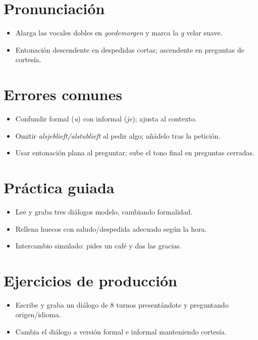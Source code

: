 \section{Pronunciación}
\begin{itemize}[leftmargin=*]
	\item Alarga las vocales dobles en \textit{goedemorgen} y marca la \textit{g} velar suave.
	\item Entonación descendente en despedidas cortas; ascendente en preguntas de cortesía.
\end{itemize}

\section{Errores comunes}
\begin{itemize}[leftmargin=*]
	\item Confundir formal (\textit{u}) con informal (\textit{je}); ajusta al contexto.
	\item Omitir \textit{alsjeblieft/alstublieft} al pedir algo; añádelo tras la petición.
	\item Usar entonación plana al preguntar; sube el tono final en preguntas cerradas.
\end{itemize}

\section{Práctica guiada}
\begin{itemize}[leftmargin=*]
	\item Lee y graba tres diálogos modelo, cambiando formalidad.
	\item Rellena huecos con saludo/despedida adecuado según la hora.
	\item Intercambio simulado: pides un café y das las gracias.
\end{itemize}

\section{Ejercicios de producción}
\begin{itemize}[leftmargin=*]
	\item Escribe y graba un diálogo de 8 turnos presentándote y preguntando origen/idioma.
	\item Cambia el diálogo a versión formal e informal manteniendo cortesía.
\end{itemize}

